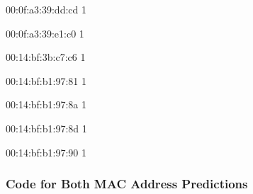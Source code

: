 \documentclass[11pt]{article}
\begin{document}
    \begin{description*}
\item[00:0f:a3:39:dd:cd] 1
\item[00:0f:a3:39:e1:c0] 1
\item[00:14:bf:3b:c7:c6] 1
\item[00:14:bf:b1:97:81] 1
\item[00:14:bf:b1:97:8a] 1
\item[00:14:bf:b1:97:8d] 1
\item[00:14:bf:b1:97:90] 1
\end{description*}


    
    \subsubsection{Code for Both MAC Address
Predictions}\label{code-for-both-mac-address-predictions}
\end{document}
